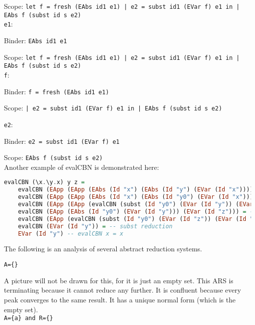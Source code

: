 \documentclass{article}
\theoremstyle{theorem}
\theoremstyle{definition}
\theoremstyle{remark}
\begin{document}
Scope: \texttt{let f = fresh (EAbs id1 e1)
| e2 = subst id1 (EVar f) e1 in
| EAbs f (subst id s e2)}\\

\noindent \texttt{e1}:

Binder: \texttt{EAbs id1 e1}

Scope: \texttt{let f = fresh (EAbs id1 e1)
| e2 = subst id1 (EVar f) e1 in
| EAbs f (subst id s e2)}\\

\noindent \texttt{f}:

Binder: \texttt{f = fresh (EAbs id1 e1)}

Scope: \texttt{| e2 = subst id1 (EVar f) e1 in
| EAbs f (subst id s e2)}

\noindent \texttt{e2}:

Binder: \texttt{e2 = subst id1 (EVar f) e1}

Scope: \texttt{EAbs f (subst id s e2)}\\

\noindent Another example of evalCBN is demonstrated here:

\begin{lstlisting}[language=Haskell]
evalCBN (\x.\y.x) y z =
    evalCBN (EApp (EApp (EAbs (Id "x") (EAbs (Id "y") (EVar (Id "x")))) (EVar (Id "y"))) (EVar (Id "z"))) = -- converted to concrete format
    evalCBN (EApp (EApp (EAbs (Id "x") (EAbs (Id "y0") (EVar (Id "x")))) (EVar (Id "y"))) (EVar (Id "z"))) = -- fresh applied in one step
    evalCBN (EApp (EApp (evalCBN (subst (Id "y0") (EVar (Id "y")) (EVar (Id "x")))) (EVar (Id "y"))) (EVar (Id "z"))) = -- line 6
    evalCBN (EApp (EAbs (Id "y0") (EVar (Id "y"))) (EVar (Id "z"))) = -- subst reduction
    evalCBN (EApp (evalCBN (subst (Id "y0") (EVar (Id "z")) (EVar (Id "y")))) (EVar (Id "z"))) = -- line 6
    evalCBN (EVar (Id "y")) = -- subst reduction
    EVar (Id "y") -- evalCBN x = x
\end{lstlisting}

The following is an analysis of several abstract reduction systems.

\noindent \texttt{A=\{\}}

A picture will not be drawn for this, for it is just an empty set. This ARS is terminating because it cannot reduce any further. It is confluent because every peak converges to the same result. It has a unique normal form (which is the empty set).\\

\noindent \texttt{A=\{a\} and R=\{\}}
\end{document}
